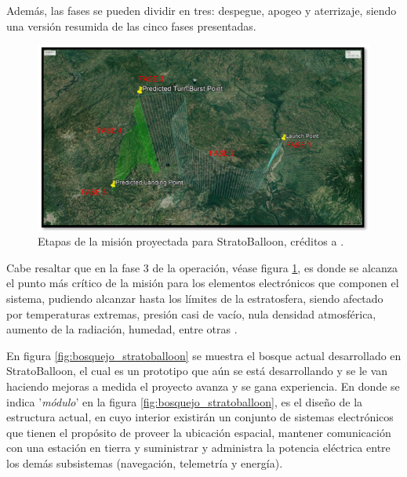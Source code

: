 Además,  las fases se pueden dividir en tres: despegue, apogeo y aterrizaje, siendo una versión resumida de las cinco fases presentadas.

\newpage

\begin{figure} [!ht]
    \centering
    \includegraphics[width=1\linewidth]{document/figures/01_etapas de la mision.png}
    \caption{Etapas de la misión proyectada para StratoBalloon, créditos a \cite{tesis_estructura_stratoballoon}.}
    \label{fig:etapas_mision_stratoballoon}
\end{figure}

Cabe resaltar que en la fase 3 de la operación, véase figura \ref{fig:etapas_mision_stratoballoon}, es donde se alcanza el punto más crítico de la misión para los elementos electrónicos que componen el sistema, pudiendo alcanzar hasta los límites de la estratosfera, siendo afectado por temperaturas extremas, presión casi de vacío, nula densidad atmosférica, aumento de la radiación, humedad, entre otras \cite{nearspaceExperiments}.

En figura \ref{fig:bosquejo_stratoballoon} se muestra el bosque actual desarrollado en StratoBalloon, el cual es un prototipo que aún se está desarrollando y se le van haciendo mejoras a medida el proyecto avanza y se gana experiencia.  En donde se indica '\textit{módulo}' en la figura \ref{fig:bosquejo_stratoballoon},  es el diseño de la estructura actual, en cuyo interior existirán un conjunto de sistemas electrónicos que tienen el propósito de proveer la ubicación espacial, mantener comunicación con una estación en tierra y suministrar y administra la potencia eléctrica entre los demás subsistemas (navegación, telemetría y energía). 


